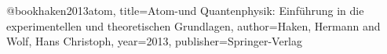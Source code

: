 \newpage
\nocite{*}



@book{haken2013atom,
  title={Atom-und Quantenphysik: Einf{\"u}hrung in die experimentellen und theoretischen Grundlagen},
  author={Haken, Hermann and Wolf, Hans Christoph},
  year={2013},
  publisher={Springer-Verlag}
}